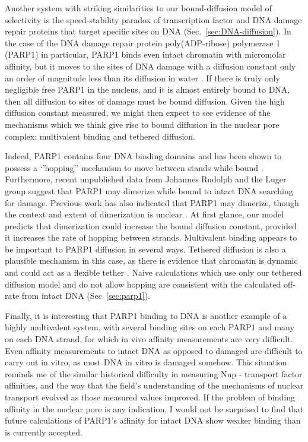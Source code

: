 Another system with striking similarities to our bound-diffusion model of selectivity is the speed-stability paradox of transcription factor and DNA damage repair proteins that target specific sites on DNA (Sec.~\ref{sec:DNA-diffusion}).  In the case of the DNA damage repair protein poly(ADP-ribose) polymerase 1 (PARP1) in particular, PARP1 binds even intact chromatin with micromolar affinity, but it moves to the sites of DNA damage with a diffusion constant only an order of magnitude less than its diffusion in water \cite{rudolph18,mahadevan18}.  If there is truly only negligible free PARP1 in the nucleus, and it is almost entirely bound to DNA, then all diffusion to sites of damage must be bound diffusion.  Given the high diffusion constant measured, we might then expect to see evidence of the mechanisms which we think give rise to bound diffusion in the nuclear pore complex: multivalent binding and tethered diffusion.  

Indeed, PARP1 contains four DNA binding domains and has been shown to possess a `'hopping'' mechanism to move between stands while bound \cite{rudolph18}.  Furthermore, recent unpublished data from Johannes Rudolph and the Luger group suggest that PARP1 may dimerize while bound to intact DNA searching for damage.  Previous work has also indicated that PARP1 may dimerize, though the context and extent of dimerization is unclear \cite{pion05,altmeyer09}.  At first glance, our model predicts that dimerization could increase the bound diffusion constant, provided it increases the rate of hopping between strands.  Multivalent binding appears to be important to PARP1 diffusion in several ways.  Tethered diffusion is also a plausible mechanism in this case, as there is evidence that chromatin is dynamic and could act as a flexible tether \cite{nozaki17,maeshima16}.  Naive calculations which use only our  tethered diffusion model and do not allow hopping are consistent with the calculated off-rate from intact DNA (Sec~\ref{sec:parp1}).  

Finally, it is interesting that PARP1 binding to DNA is another example of a highly multivalent system, with several binding sites on each PARP1 and many on each DNA strand, for which in vivo affinity measurements are very difficult.  Even affinity measurements to intact DNA as opposed to damaged are difficult to carry out in vitro, as most DNA in vitro is damaged somehow.  This situation reminds me of the similar historical difficulty in measuring Nup - transport factor affinities, and the way that the field's understanding of the mechanisms of nuclear transport evolved as those measured values improved.   If the problem of binding affinity in the nuclear pore is any indication, I would not be surprised to find that future calculations of PARP1's affinity for intact DNA show weaker binding than is currently accepted. 

